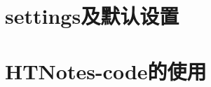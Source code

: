 \documentclass[openany,customfont=true]{HTNotes}
\begin{document}
\maketitle
\makeflypage

\frontmatter
\tableofcontents

\mainmatter
\chapter{settings及默认设置}
  

\chapter{HTNotes-code的使用}
  

\backmatter
\makebackcover
\end{document}
